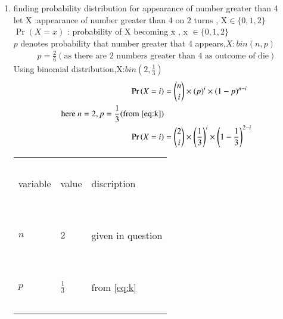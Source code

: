\documentclass[journal,12pt,onecolumn]{IEEEtran}
\providecommand{\pr}[1]{\ensuremath{\Pr\left(#1\right)}}
\providecommand{\brak}[1]{\ensuremath{\left(#1\right)}}
\theoremstyle{remark}
\begin{document}
\begin{enumerate}
\item finding probability distribution for appearance of number greater than 4\\
let X :appearance of number greater than 4 on 2 turns , X$\in \{0,1,2\}$\\
$\pr{X=x}$ : probability of X becoming x , x $\in \{ 0,1,2 \}$\\
$p$ denotes probability that number greater that 4 appears,$X:bin(n,p)$ 
\begin{align}
p=\frac{2}{6}(\text{as there are 2 numbers greater than  4 as outcome of die})\label{eq:k} 
\end{align}
Using binomial distribution,X:$bin(2,\frac{1}{3})$
\begin{align}
\pr{X=i}&={n \choose i}\times(p)^i\times(1-p)^{n-i}\\
\text{here } n=2,p=\frac{1}{3}  (\text{from } \eqref{eq:k})\\
\pr{X=i}&={2 \choose i}\times \brak{\frac{1}{3}}^i\times\brak{1-\frac{1}{3}}^{2-i} \label{eq:r}
\end{align}
\begin{tabular}{|l|l|l|}
\hline
\ &\ &\ \\
\large variable & \large value & \large discription\\
\ & \ & \ \\
\hline
\ &\ &\  \\
\large {$n$} & \large{$2$} & given  in question\\
\ & \ & \   \\
\hline
\ & \ & \   \\
\large {$p$} & \large$\frac{1}{3}$ & from \eqref{eq:k}\\
\ & \ & \   \\
\hline
\end{tabular}
\vspace{2mm}\\
\begin{enumerate}



\end{enumerate}
\end{enumerate}
\end{document}
